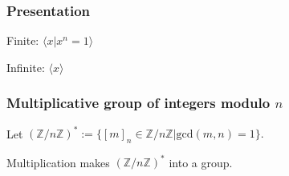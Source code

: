 \subsubsection{Presentation}
Finite: $\langle x | x^n = 1 \rangle$\newline

\noindent Infinite: $\langle x \rangle$

\subsubsection{Multiplicative group of integers modulo $n$}\label{multiplicativegroupofintegersmodn}
\noindent Let $(\mathbb{Z} / n \mathbb{Z})^* := \{[m]_n \in \mathbb{Z} / n \mathbb{Z} | \textrm{gcd}(m,n)=1 \}.$

\begin{proposition}
Multiplication makes $(\mathbb{Z} / n \mathbb{Z})^*$ into a group.
\end{proposition}
